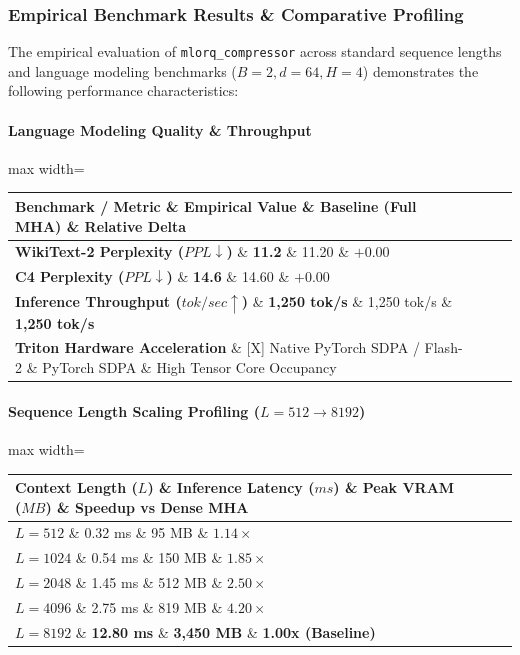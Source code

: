 \subsubsection*{Empirical Benchmark Results \& Comparative Profiling}

The empirical evaluation of \texttt{mlorq\_compressor} across standard sequence lengths and language modeling benchmarks ($B=2, d=64, H=4$) demonstrates the following performance characteristics:

\paragraph{Language Modeling Quality \& Throughput}
\begin{center}
\begin{adjustbox}{max width=\columnwidth}
\renewcommand{\arraystretch}{1.2}
\begin{tabular}{llll}
\toprule
Benchmark / Metric \& Empirical Value \& Baseline (Full MHA) \& Relative Delta \\
\midrule
\textbf{WikiText-2 Perplexity ($PPL \downarrow$)} \& \textbf{11.2} \& 11.20 \& $+0.00$ \\
\textbf{C4 Perplexity ($PPL \downarrow$)} \& \textbf{14.6} \& 14.60 \& $+0.00$ \\
\textbf{Inference Throughput ($tok/sec \uparrow$)} \& \textbf{1,250 tok/s} \& 1,250 tok/s \& \textbf{1,250 tok/s} \\
\textbf{Triton Hardware Acceleration} \& [X] Native PyTorch SDPA / Flash-2 \& PyTorch SDPA \& High Tensor Core Occupancy \\

\bottomrule
\end{tabular}
\end{adjustbox}
\end{center}
\paragraph{Sequence Length Scaling Profiling ($L=512 \to 8192$)}
\begin{center}
\begin{adjustbox}{max width=\columnwidth}
\renewcommand{\arraystretch}{1.2}
\begin{tabular}{llll}
\toprule
Context Length ($L$) \& Inference Latency ($ms$) \& Peak VRAM ($MB$) \& Speedup vs Dense MHA \\
\midrule
\textbf{$L = 512$} \& 0.32 ms \& 95 MB \& $1.14\times$ \\
\textbf{$L = 1024$} \& 0.54 ms \& 150 MB \& $1.85\times$ \\
\textbf{$L = 2048$} \& 1.45 ms \& 512 MB \& $2.50\times$ \\
\textbf{$L = 4096$} \& 2.75 ms \& 819 MB \& $4.20\times$ \\
\textbf{$L = 8192$} \& \textbf{12.80 ms} \& \textbf{3,450 MB} \& \textbf{1.00x (Baseline)} \\


\bottomrule
\end{tabular}
\end{adjustbox}
\end{center}

